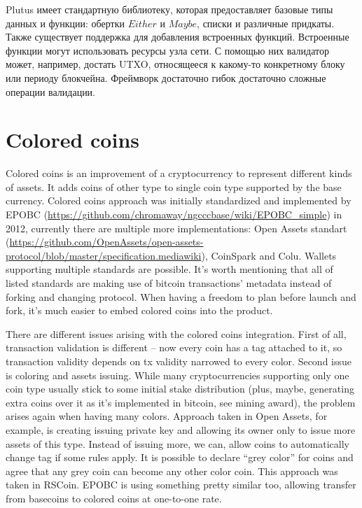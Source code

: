 \documentclass[]{itmo-student-thesis}
\begin{document}
Plutus имеет стандартную библиотеку, которая предоставляет базовые
типы данных и функции: обертки $Either$ и $Maybe$, списки и различные
придкаты. Также существует поддержка для добавления встроенных
функций. Встроенные функции могут использовать ресурсы узла сети. С
помощью них валидатор может, например, достать UTXO, относящееся к
какому-то конкретному блоку или периоду блокчейна. Фреймворк
достаточно гибок достаточно сложные операции валидации.

\section{Colored coins}

Colored coins is an improvement of a cryptocurrency to represent
different kinds of assets. It adds coins of other type to single coin
type supported by the base currency. Colored coins approach was
initially standardized and implemented by EPOBC
(\url{https://github.com/chromaway/ngcccbase/wiki/EPOBC_simple}) in
2012, currently there are multiple more implementations: Open Assets
standart
(\url{https://github.com/OpenAssets/open-assets-protocol/blob/master/specification.mediawiki}),
CoinSpark and Colu. Wallets supporting multiple standards are
possible. It’s worth mentioning that all of listed standards are
making use of bitcoin transactions’ metadata instead of forking and
changing protocol. When having a freedom to plan before launch and
fork, it’s much easier to embed colored coins into the product.

There are different issues arising with the colored coins
integration. First of all, transaction validation is different -- now
every coin has a tag attached to it, so transaction validity depends
on tx validity narrowed to every color. Second issue is coloring and
assets issuing. While many cryptocurrencies supporting only one coin
type usually stick to some initial stake distribution (plus, maybe,
generating extra coins over it as it’s implemented in bitcoin, see
mining award), the problem arises again when having many
colors. Approach taken in Open Assets, for example, is creating
issuing private key and allowing its owner only to issue more assets
of this type. Instead of issuing more, we can, allow coins to
automatically change tag if some rules apply. It is possible to
declare “grey color” for coins and agree that any grey coin can become
any other color coin. This approach was taken in RSCoin. EPOBC is
using something pretty similar too, allowing transfer from basecoins
to colored coins at one-to-one rate.
\end{document}
